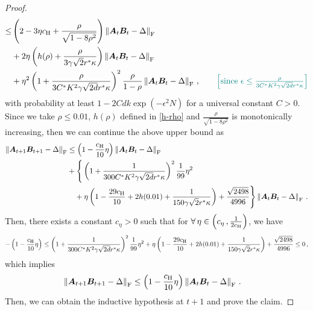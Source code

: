 \begin{proof}
\begin{align*}
        \leq & \left(2-3\eta c_{\rm H}+ \frac{\rho}{\sqrt{1-8\rho^2}}\right)\left\|\bm A_t \bm B_t - \Delta\right\|_{\rm F}\\
        & + 2\eta\left(h(\rho) + \frac{\rho}{3\gamma\sqrt{2}r^*\kappa}\right) \left\|\bm A_t \bm B_t - \Delta\right\|_{\rm F}\\
        & + \eta^2 \left(1+\frac{\rho}{3C^*K^2\gamma\sqrt{2d}r^*\kappa}\right)^2 \frac{\rho}{1-\rho}\left\|\bm A_t\bm B_t-\Delta\right\|_{\rm F}\,, \tag*{\color{teal}$\left[\text{since }\epsilon \leq \frac{\rho}{3C^*K^2\gamma\sqrt{2d}r^*\kappa}\right]$}
    \end{align*}
    with probability at least $1-2Cdk\operatorname{exp}\left(-\epsilon^2 N\right)$ for a universal constant $C>0$. Since we take $\rho \leq 0.01$, $h(\rho)$ defined in \cref{h-rho} and $\frac{\rho}{\sqrt{1-8\rho^{2}}}$ is monotonically increasing, then we can continue the above upper bound as
    \begin{align*}
        \left\|\bm A_{t+1}\bm B_{t+1} - \Delta\right\|_{\rm F} & \leq \left(1-\frac{c_{\rm H}}{10}\eta\right)\left\|\bm A_t \bm B_t - \Delta\right\|_{\rm F}\\
        & + \Bigg\{\left(1+\frac{1}{300 C^*K^2\gamma\sqrt{2d}r^*\kappa}\right)^2 \frac{1}{99} \eta^2 \\
        & \quad +\eta\left(1-\frac{29 c_{\rm H}}{10} + 2h(0.01)+\frac{1}{150\gamma \sqrt{2}r^*\kappa}\right) +\frac{\sqrt{2498}}{4996}\Bigg\}\left\|\bm A_t \bm B_t - \Delta\right\|_{\rm F}\,.
        \end{align*}
        Then, there exists a constant $c_{\eta}>0$ such that for $\forall\,\eta\in\left(c_{\eta}\,,\frac{1}{2 c_{\rm H}}\right)$, we have
        \begin{align*}
        -\left(1-\frac{c_{\rm H}}{10}\eta\right)\leq 
        \left(1+\frac{1}{300 C^*K^2\gamma\sqrt{2d}r^*\kappa}\right)^2 \frac{1}{99} \eta^2+\eta\left(1-\frac{29 c_{\rm H}}{10} + 2h(0.01)+\frac{1}{150\gamma \sqrt{2}r^*\kappa}\right) +\frac{\sqrt{2498}}{4996}
        \leq 0\,,
        \end{align*}
        which implies
        \begin{align*}
            \left\|\bm A_{t+1}\bm B_{t+1} - \Delta\right\|_{\rm F} & \leq \left(1-\frac{c_{\rm H}}{10}\eta\right)\left\|\bm A_t \bm B_t - \Delta\right\|_{\rm F}\,.
        \end{align*}
        Then, we can obtain the inductive hypothesis at $t+1$ and prove the claim.
\end{proof}

